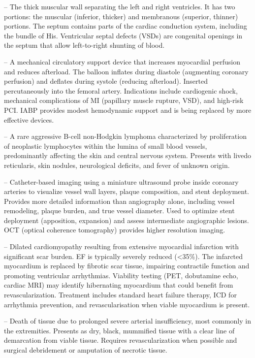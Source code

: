 -- The thick muscular wall separating the left and right ventricles. It has two portions: the muscular (inferior, thicker) and membranous (superior, thinner) portions. The septum contains parts of the cardiac conduction system, including the bundle of His. Ventricular septal defects (VSDs) are congenital openings in the septum that allow left-to-right shunting of blood.

-- A mechanical circulatory support device that increases myocardial perfusion and reduces afterload. The balloon inflates during diastole (augmenting coronary perfusion) and deflates during systole (reducing afterload). Inserted percutaneously into the femoral artery. Indications include cardiogenic shock, mechanical complications of MI (papillary muscle rupture, VSD), and high-risk PCI. IABP provides modest hemodynamic support and is being replaced by more effective devices.

-- A rare aggressive B-cell non-Hodgkin lymphoma characterized by proliferation of neoplastic lymphocytes within the lumina of small blood vessels, predominantly affecting the skin and central nervous system. Presents with livedo reticularis, skin nodules, neurological deficits, and fever of unknown origin.

-- Catheter-based imaging using a miniature ultrasound probe inside coronary arteries to visualize vessel wall layers, plaque composition, and stent deployment. Provides more detailed information than angiography alone, including vessel remodeling, plaque burden, and true vessel diameter. Used to optimize stent deployment (apposition, expansion) and assess intermediate angiographic lesions. OCT (optical coherence tomography) provides higher resolution imaging.

-- Dilated cardiomyopathy resulting from extensive myocardial infarction with significant scar burden. EF is typically severely reduced (<35\%). The infarcted myocardium is replaced by fibrotic scar tissue, impairing contractile function and promoting ventricular arrhythmias. Viability testing (PET, dobutamine echo, cardiac MRI) may identify hibernating myocardium that could benefit from revascularization. Treatment includes standard heart failure therapy, ICD for arrhythmia prevention, and revascularisation when viable myocardium is present.

-- Death of tissue due to prolonged severe arterial insufficiency, most commonly in the extremities. Presents as dry, black, mummified tissue with a clear line of demarcation from viable tissue. Requires revascularization when possible and surgical debridement or amputation of necrotic tissue.


